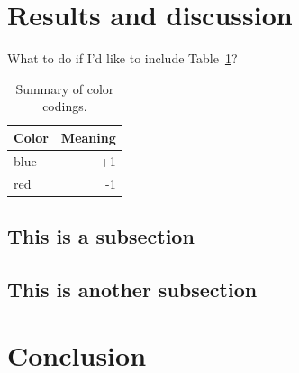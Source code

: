 \documentclass[a4paper,11pt,pdftex]{article}
\begin{document}
\section{Results and discussion}

What to do if I'd like to include Table~\ref{table:ising}?

\begin{table}[h!]
  \begin{center}
    \begin{tabular}{lr}
    Color & Meaning\\ \hline
    blue & +1\\
    red & -1
  \end{tabular}
  \label{table:ising}
  \caption{Summary of color codings.}
  \end{center}
\end{table}


\subsection{This is a subsection}

\subsection{This is another subsection}

\section{Conclusion}

\clearpage



\end{document}
